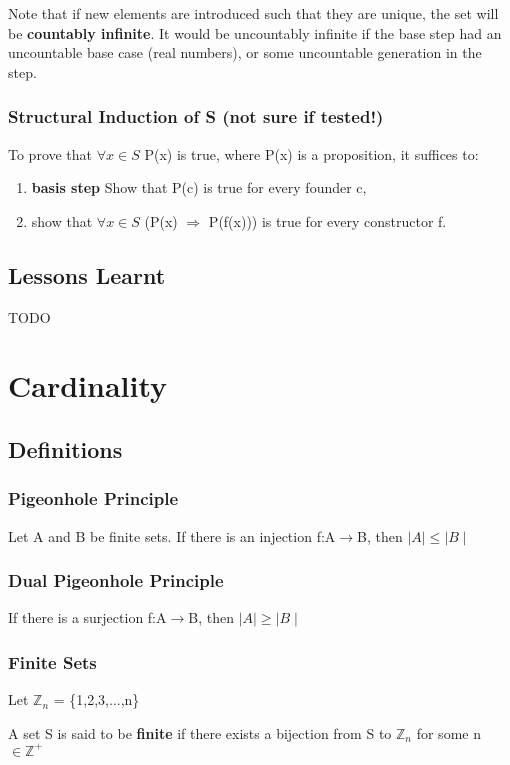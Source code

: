\documentclass{article}
\begin{document}
Note that if new elements are introduced such that they are unique, the set will be \textbf{countably infinite}. It would be uncountably infinite if the base step had an uncountable base case (real numbers), or some uncountable generation in the step.

\subsubsection{Structural Induction of S (not sure if tested!)}
To prove that $\forall x \in S$ P(x) is true, where P(x) is a proposition, it suffices to:
\begin{enumerate}
    \item \textbf{basis step} Show that P(c) is true for every founder c,
    \item show that $\forall x \in S$ (P(x) $\Rightarrow$ P(f(x))) is true for every constructor f.
\end{enumerate}

\subsection{Lessons Learnt}
TODO

\section{Cardinality}
\subsection{Definitions}
\subsubsection{Pigeonhole Principle}
Let A and B be finite sets. If there is an injection f:A$\rightarrow$B, then $\mid A \mid \leq \mid B \mid $

\subsubsection{Dual Pigeonhole Principle}
If there is a surjection f:A$\rightarrow$B, then $\mid A \mid \geq \mid B \mid$

\subsubsection{Finite Sets}
Let $\mathbb{Z}_n$ = \{1,2,3,...,n\}

A set S is said to be \textbf{finite} if there exists a bijection from S to $\mathbb{Z}_n$ for some n$\in \mathbb{Z}^+$
\end{document}

